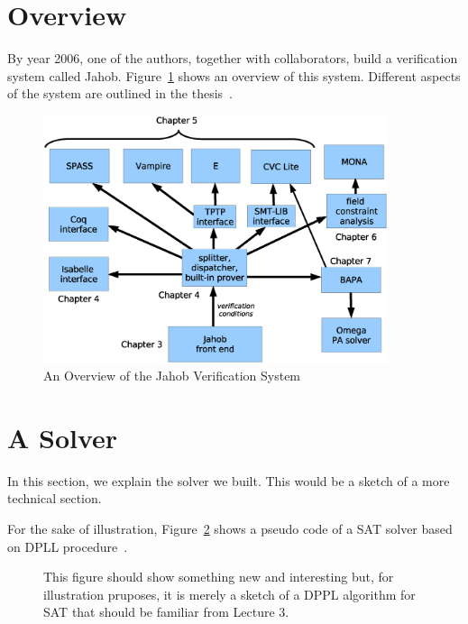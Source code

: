 \documentclass[a4paper,UKenglish,cleveref, autoref, thm-restate]{lipics-v2021}
\begin{document}
\section{Overview}

By year 2006, one of the authors, together with
collaborators, build a verification system called
Jahob. Figure~\ref{fig:overview} shows an overview of this
system. Different aspects of the system are outlined in the
thesis~\cite{Kuncak07DecisionProceduresModularDataStructureVerification}.

\begin{figure}
  \includegraphics[width=0.9\textwidth]{system-diagram.eps} %
  \caption{An Overview of the Jahob Verification System\label{fig:overview}}
\end{figure}

\section{A Solver}

In this section, we explain the solver we built.
This would be a sketch of a more technical section.

For the sake of illustration, Figure~\ref{fig:dpll} shows a
pseudo code of a SAT solver based on DPLL
procedure~\cite{10.1145/321033.321034}.
\begin{figure}
  \newcommand{\BB}{Bool} %
  \caption{This figure should show something new and interesting but, for illustration pruposes, it is merely a sketch
    of a DPPL algorithm for SAT that should be familiar from Lecture 3.\label{fig:dpll}}  
\end{figure}
\end{document}
